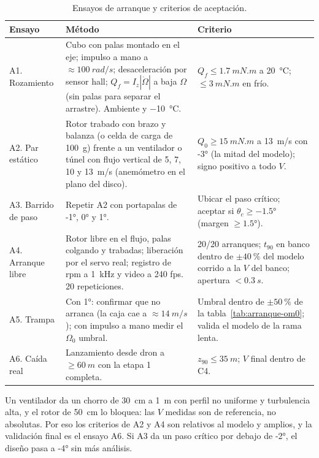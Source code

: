 \begin{table}[H]
\centering
\small
\caption{Ensayos de arranque y criterios de aceptación.}
\label{tab:arranque-ensayo}
\begin{tabularx}{\textwidth}{lYY}
\toprule
Ensayo & Método & Criterio \\
\midrule
A1. Rozamiento & Cubo con palas montado en el eje; impulso a mano a $\approx\SI{100}{rad/s}$; desaceleración por sensor hall; $Q_f=I_z|\dot\Omega|$ a baja $\Omega$ (sin palas para separar el arrastre). Ambiente y \SI{-10}{\celsius}. & $Q_f\le\SI{1.7}{mN.m}$ a \SI{20}{\celsius}; $\le\SI{3}{mN.m}$ en frío. \\
A2. Par estático & Rotor trabado con brazo y balanza (o celda de carga de \SI{100}{g}) frente a un ventilador o túnel con flujo vertical de 5, 7, 10 y \SI{13}{m/s} (anemómetro en el plano del disco). & $Q_0\ge\SI{15}{mN.m}$ a \SI{13}{m/s} con \ang{-3} (la mitad del modelo); signo positivo a todo $V$. \\
A3. Barrido de paso & Repetir A2 con portapalas de \ang{-1}, \ang{0} y \ang{+1}. & Ubicar el paso crítico; aceptar si $\theta_c\ge\ang{-1.5}$ (margen $\ge\ang{1.5}$). \\
A4. Arranque libre & Rotor libre en el flujo, palas colgando y trabadas; liberación por el servo real; registro de rpm a \SI{1}{kHz} y video a 240 fps. 20 repeticiones. & 20/20 arranques; $t_{90}$ en banco dentro de $\pm\SI{40}{\percent}$ del modelo corrido a la $V$ del banco; apertura $<\SI{0.3}{s}$. \\
A5. Trampa & Con \ang{+1}: confirmar que no arranca (la caja cae a $\approx\SI{14}{m/s}$); con impulso a mano medir el $\Omega_0$ umbral. & Umbral dentro de $\pm\SI{50}{\percent}$ de la tabla~\ref{tab:arranque-om0}; valida el modelo de la rama lenta. \\
A6. Caída real & Lanzamiento desde dron a $\ge\SI{60}{m}$ con la etapa 1 completa. & $z_{90}\le\SI{35}{m}$; $V$ final dentro de C4. \\
\bottomrule
\end{tabularx}
\end{table}

\begin{nota}
Un ventilador da un chorro de \SI{30}{cm} a \SI{1}{m} con perfil no uniforme y turbulencia
alta, y el rotor de \SI{50}{cm} lo bloquea: las $V$ medidas son de referencia, no
absolutas. Por eso los criterios de A2 y A4 son relativos al modelo y amplios, y la
validación final es el ensayo A6. Si A3 da un paso crítico por debajo de \ang{-2}, el diseño
pasa a \ang{-4} sin más análisis.
\end{nota}

